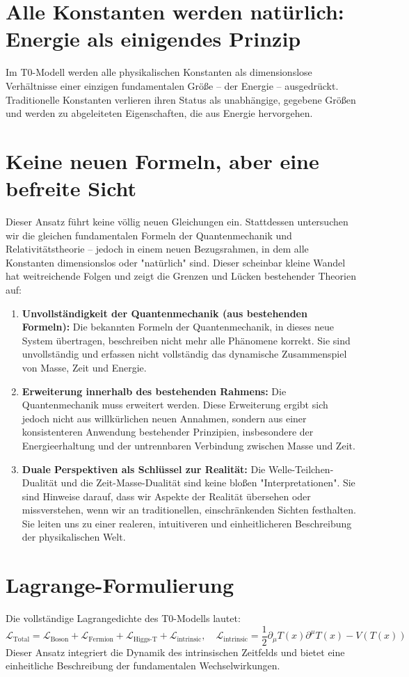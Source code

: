 \documentclass{article}
\newcommand{\Tfield}{T(x)}
\begin{document}
	\section{Alle Konstanten werden natürlich: Energie als einigendes Prinzip}
	Im T0-Modell werden alle physikalischen Konstanten als dimensionslose Verhältnisse einer einzigen fundamentalen Größe – der Energie – ausgedrückt. Traditionelle Konstanten verlieren ihren Status als unabhängige, gegebene Größen und werden zu abgeleiteten Eigenschaften, die aus Energie hervorgehen.
	
	\section{Keine neuen Formeln, aber eine befreite Sicht}
	Dieser Ansatz führt keine völlig neuen Gleichungen ein. Stattdessen untersuchen wir die gleichen fundamentalen Formeln der Quantenmechanik und Relativitätstheorie – jedoch in einem neuen Bezugsrahmen, in dem alle Konstanten dimensionslos oder "natürlich" sind. Dieser scheinbar kleine Wandel hat weitreichende Folgen und zeigt die Grenzen und Lücken bestehender Theorien auf:
	\begin{enumerate}
		\item \textbf{Unvollständigkeit der Quantenmechanik (aus bestehenden Formeln):} Die bekannten Formeln der Quantenmechanik, in dieses neue System übertragen, beschreiben nicht mehr alle Phänomene korrekt. Sie sind unvollständig und erfassen nicht vollständig das dynamische Zusammenspiel von Masse, Zeit und Energie.
		\item \textbf{Erweiterung innerhalb des bestehenden Rahmens:} Die Quantenmechanik muss erweitert werden. Diese Erweiterung ergibt sich jedoch nicht aus willkürlichen neuen Annahmen, sondern aus einer konsistenteren Anwendung bestehender Prinzipien, insbesondere der Energieerhaltung und der untrennbaren Verbindung zwischen Masse und Zeit.
		\item \textbf{Duale Perspektiven als Schlüssel zur Realität:} Die Welle-Teilchen-Dualität und die Zeit-Masse-Dualität sind keine bloßen "Interpretationen". Sie sind Hinweise darauf, dass wir Aspekte der Realität übersehen oder missverstehen, wenn wir an traditionellen, einschränkenden Sichten festhalten. Sie leiten uns zu einer realeren, intuitiveren und einheitlicheren Beschreibung der physikalischen Welt.
	\end{enumerate}
	
	\section{Lagrange-Formulierung}
	Die vollständige Lagrangedichte des T0-Modells lautet:
	\begin{equation}
		\mathcal{L}_{\text{Total}} = \mathcal{L}_{\text{Boson}} + \mathcal{L}_{\text{Fermion}} + \mathcal{L}_{\text{Higgs-T}} + \mathcal{L}_{\text{intrinsic}}, \quad \mathcal{L}_{\text{intrinsic}} = \frac{1}{2} \partial_\mu \Tfield \partial^\mu \Tfield - V(\Tfield)
	\end{equation}
	Dieser Ansatz integriert die Dynamik des intrinsischen Zeitfelds und bietet eine einheitliche Beschreibung der fundamentalen Wechselwirkungen.
	
\end{document}
